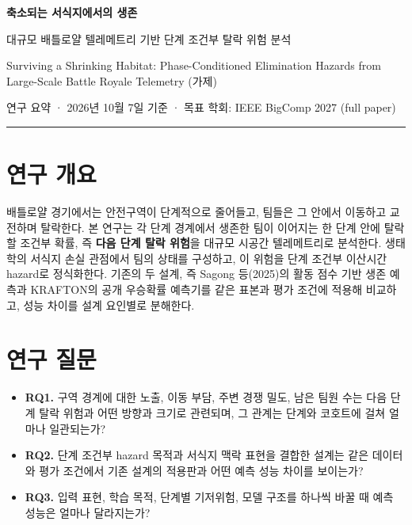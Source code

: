 \documentclass[10pt,a4paper]{article}
\begin{document}
{\LARGE\bfseries 축소되는 서식지에서의 생존\par}
\vspace{2pt}
{\large 대규모 배틀로얄 텔레메트리 기반 단계 조건부 탈락 위험 분석\par}
\vspace{2pt}
{\small\color{gray} Surviving a Shrinking Habitat: Phase-Conditioned Elimination Hazards from Large-Scale Battle Royale Telemetry (가제)\par}
\vspace{2pt}
{\small 연구 요약 · 2026년 10월 7일 기준 · 목표 학회: IEEE BigComp 2027 (full paper)\par}
\vspace{4pt}
{\color{accent}\rule{\linewidth}{0.8pt}}

\section{연구 개요}
배틀로얄 경기에서는 안전구역이 단계적으로 줄어들고, 팀들은 그 안에서 이동하고 교전하며 탈락한다.
본 연구는 각 단계 경계에서 생존한 팀이 이어지는 한 단계 안에 탈락할 조건부 확률, 즉 \textbf{다음 단계 탈락 위험}을 대규모 시공간 텔레메트리로 분석한다.
생태학의 서식지 손실 관점에서 팀의 상태를 구성하고, 이 위험을 단계 조건부 이산시간 hazard로 정식화한다.
기존의 두 설계, 즉 Sagong 등(2025)의 활동 점수 기반 생존 예측과 KRAFTON의 공개 우승확률 예측기를 같은 표본과 평가 조건에 적용해 비교하고, 성능 차이를 설계 요인별로 분해한다.

\section{연구 질문}
\begin{itemize}
  \item \textbf{RQ1.} 구역 경계에 대한 노출, 이동 부담, 주변 경쟁 밀도, 남은 팀원 수는 다음 단계 탈락 위험과 어떤 방향과 크기로 관련되며, 그 관계는 단계와 코호트에 걸쳐 얼마나 일관되는가?
  \item \textbf{RQ2.} 단계 조건부 hazard 목적과 서식지 맥락 표현을 결합한 설계는 같은 데이터와 평가 조건에서 기존 설계의 적용판과 어떤 예측 성능 차이를 보이는가?
  \item \textbf{RQ3.} 입력 표현, 학습 목적, 단계별 기저위험, 모델 구조를 하나씩 바꿀 때 예측 성능은 얼마나 달라지는가?
\end{itemize}
\end{document}
